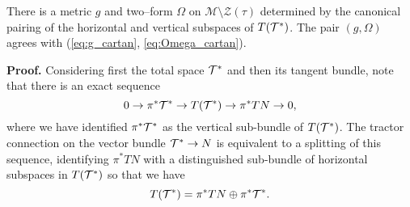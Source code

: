 
\begin{theo}\cite{DGW}\label{metric} 
There is a metric $g$ and two--form $\Omega$ on $\mathcal{M}\setminus \mathcal{Z}(\tau)$ determined by the canonical pairing of the horizontal and vertical subspaces of $T(\mathcal{T}^*)$. The pair $(g,\Omega)$ agrees with (\ref{eq:g_cartan}, \ref{eq:Omega_cartan}).
\end{theo}
{\bf Proof.}
 Considering first the total space $\mathcal{T}^*$ and then its tangent
 bundle, note that there is an exact sequence
  \begin{equation}\label{TM}
0\to \pi^* \mathcal{T}^*\to T(\mathcal{T}^*)\to \pi^*TN\to 0,
  \end{equation}
  where we have identified $\pi^* \mathcal{T}^*$ as the vertical sub-bundle of $T(\mathcal{T}^*)$.
The tractor connection on the vector bundle $\mathcal{T}^*\to N$ is equivalent to a splitting of this sequence, identifying $\pi^*TN$ with a distinguished  sub-bundle of horizontal subspaces in 
$ T(\mathcal{T}^*)$ so that we have 
\begin{equation}\label{HV}
T(\mathcal{T}^*)=  \pi^*TN\oplus \pi^* \mathcal{T}^* .
\end{equation}

